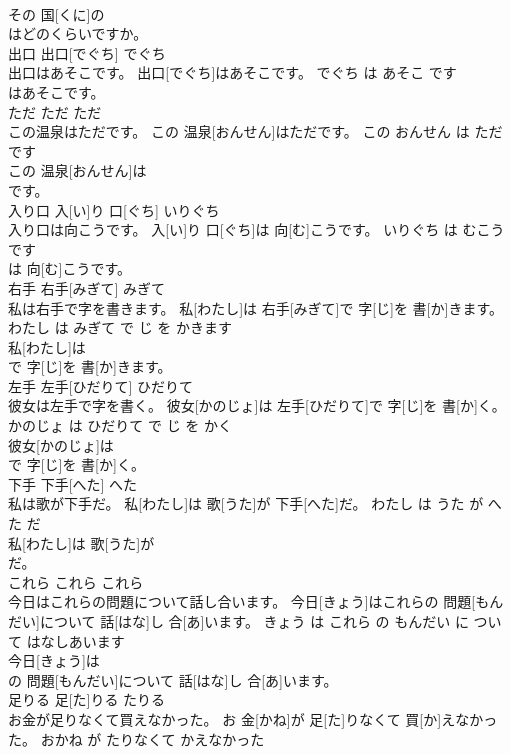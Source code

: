 \documentclass[8pt]{extreport}
\begin{document}
\begin{CJK}{UTF8}{min}
\\	その 国[くに]の
\\	はどのくらいですか。			
\\	出口	出口[でぐち]	でぐち	
\\	出口はあそこです。	出口[でぐち]はあそこです。	でぐち は あそこ です	
\\	はあそこです。			
\\	ただ	ただ	ただ	
\\	この温泉はただです。	この 温泉[おんせん]はただです。	この おんせん は ただ です	
\\	この 温泉[おんせん]は
\\	です。			
\\	入り口	入[い]り 口[ぐち]	いりぐち	
\\	入り口は向こうです。	入[い]り 口[ぐち]は 向[む]こうです。	いりぐち は むこう です	
\\	は 向[む]こうです。			
\\	右手	右手[みぎて]	みぎて	
\\	私は右手で字を書きます。	私[わたし]は 右手[みぎて]で 字[じ]を 書[か]きます。	わたし は みぎて で じ を かきます	
\\	私[わたし]は
\\	で 字[じ]を 書[か]きます。			
\\	左手	左手[ひだりて]	ひだりて	
\\	彼女は左手で字を書く。	彼女[かのじょ]は 左手[ひだりて]で 字[じ]を 書[か]く。	かのじょ は ひだりて で じ を かく	
\\	彼女[かのじょ]は
\\	で 字[じ]を 書[か]く。			
\\	下手	下手[へた]	へた	
\\	私は歌が下手だ。	私[わたし]は 歌[うた]が 下手[へた]だ。	わたし は うた が へた だ	
\\	私[わたし]は 歌[うた]が
\\	だ。			
\\	これら	これら	これら	
\\	今日はこれらの問題について話し合います。	今日[きょう]はこれらの 問題[もんだい]について 話[はな]し 合[あ]います。	きょう は これら の もんだい に ついて はなしあいます	
\\	今日[きょう]は
\\	の 問題[もんだい]について 話[はな]し 合[あ]います。			
\\	足りる	足[た]りる	たりる	
\\	お金が足りなくて買えなかった。	お 金[かね]が 足[た]りなくて 買[か]えなかった。	おかね が たりなくて かえなかった	

\end{CJK}
\end{document}

